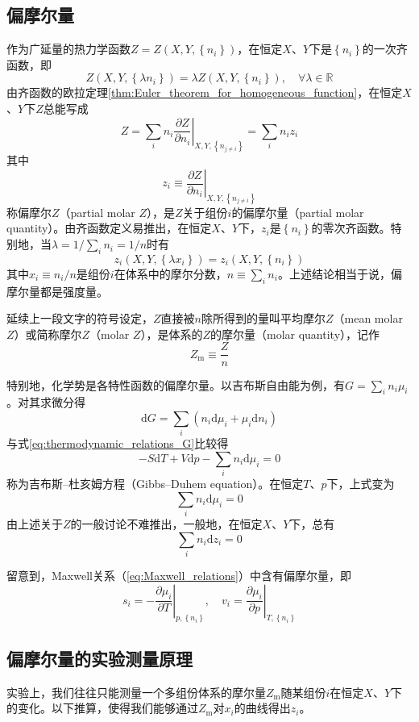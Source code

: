 \documentclass[main.tex]{subfiles}
\begin{document}
\subsection{偏摩尔量}
作为广延量的热力学函数$Z=Z\left(X,Y,\left\{n_i\right\}\right)$，在恒定$X$、$Y$下是$\left\{n_i\right\}$的一次齐函数，即
\[Z\left(X,Y,\left\{\lambda n_i\right\}\right)=\lambda Z\left(X,Y,\left\{n_i\right\}\right),\quad\forall\lambda\in\mathbb{R}\]
由齐函数的欧拉定理\ref{thm:Euler_theorem_for_homogeneous_function}，在恒定$X$、$Y$下$Z$总能写成
\[Z=\sum_i n_i\left.\frac{\partial Z}{\partial n_i}\right|_{X,Y,\left\{n_{j\neq i}\right\}}=\sum_i n_i z_i\]
其中
\[z_i\equiv\left.\frac{\partial Z}{\partial n_i}\right|_{X,Y,\left\{n_{j\neq i}\right\}}\]
称偏摩尔$Z$（partial molar $Z$），是$Z$关于组份$i$的偏摩尔量（partial molar quantity）。由齐函数定义易推出，在恒定$X$、$Y$下，$z_i$是$\left\{n_i\right\}$的零次齐函数。特别地，当$\lambda=1/\sum_i n_i=1/n$时有
\[z_i\left(X,Y,\left\{\lambda x_i\right\}\right)=z_i\left(X,Y,\left\{n_i\right\}\right)\]
其中$x_i\equiv n_i/n$是组份$i$在体系中的摩尔分数，$n\equiv\sum_i n_i$。上述结论相当于说，偏摩尔量都是强度量。

延续上一段文字的符号设定，$Z$直接被$n$除所得到的量叫平均摩尔$Z$（mean molar $Z$）或简称摩尔$Z$（molar $Z$），是体系的$Z$的摩尔量（molar quantity），记作
\[Z_\text{m}\equiv\frac{Z}{n}\]

特别地，化学势是各特性函数的偏摩尔量。以吉布斯自由能为例，有$G=\sum_i n_i\mu_i$。对其求微分得
\[\mathrm{d}G=\sum_i\left(n_i\mathrm{d}\mu_i+\mu_i\mathrm{d}n_i\right)\]
与式\eqref{eq:thermodynamic_relations_G}比较得
\begin{equation}\label{eq:Gibbs-Duhem eq.}
    -S\mathrm{d}T+V\mathrm{d}p-\sum_i n_i\mathrm{d}\mu_i=0
\end{equation}
称为吉布斯--杜亥姆方程（Gibbs--Duhem equation）。在恒定$T$、$p$下，上式变为
\[\sum_i n_i\mathrm{d}\mu_i=0\]
由上述关于$Z$的一般讨论不难推出，一般地，在恒定$X$、$Y$下，总有
\begin{equation}\label{eq:generalized_Gibbs_Duhem eq.}
    \sum_i n_i \mathrm{d}z_i=0
\end{equation}

留意到，Maxwell关系（\eqref{eq:Maxwell_relations}）中含有偏摩尔量，即
\[s_i=-\left.\frac{\partial\mu_i}{\partial T}\right|_{p,\left\{n_i\right\}},\quad v_i=\left.\frac{\partial\mu_i}{\partial p}\right|_{T,\left\{n_i\right\}}\]

\subsection{偏摩尔量的实验测量原理}
实验上，我们往往只能测量一个多组份体系的摩尔量$Z_\text{m}$随某组份$i$在恒定$X$、$Y$下的变化。以下推算，使得我们能够通过$Z_\text{m}$对$x_i$的曲线得出$z_i$。
\end{document}
